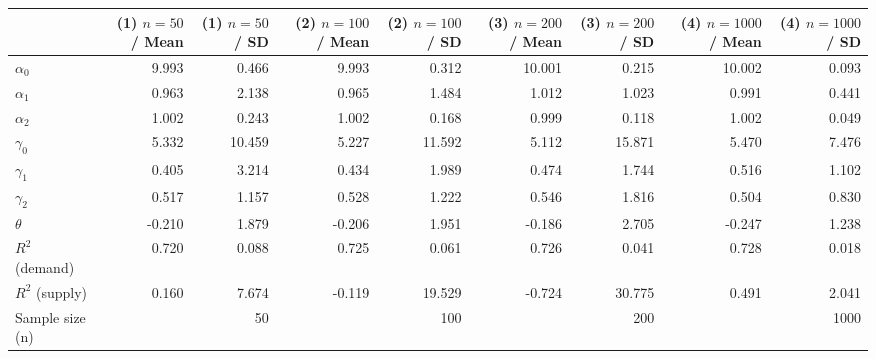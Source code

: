 
\begin{tabular}[t]{lrrrrrrrr}
\toprule
  & (1) $n=50$ / Mean & (1) $n=50$ / SD & (2) $n=100$ / Mean & (2) $n=100$ / SD & (3) $n=200$ / Mean & (3) $n=200$ / SD & (4) $n=1000$ / Mean & (4) $n=1000$ / SD\\
\midrule
$\alpha_{0}$ & 9.993 & 0.466 & 9.993 & 0.312 & 10.001 & 0.215 & 10.002 & 0.093\\
$\alpha_{1}$ & 0.963 & 2.138 & 0.965 & 1.484 & 1.012 & 1.023 & 0.991 & 0.441\\
$\alpha_{2}$ & 1.002 & 0.243 & 1.002 & 0.168 & 0.999 & 0.118 & 1.002 & 0.049\\
$\gamma_{0}$ & 5.332 & 10.459 & 5.227 & 11.592 & 5.112 & 15.871 & 5.470 & 7.476\\
$\gamma_{1}$ & 0.405 & 3.214 & 0.434 & 1.989 & 0.474 & 1.744 & 0.516 & 1.102\\
$\gamma_{2}$ & 0.517 & 1.157 & 0.528 & 1.222 & 0.546 & 1.816 & 0.504 & 0.830\\
$\theta$ & -0.210 & 1.879 & -0.206 & 1.951 & -0.186 & 2.705 & -0.247 & 1.238\\
$R^{2}$ (demand) & 0.720 & 0.088 & 0.725 & 0.061 & 0.726 & 0.041 & 0.728 & 0.018\\
$R^{2}$ (supply) & 0.160 & 7.674 & -0.119 & 19.529 & -0.724 & 30.775 & 0.491 & 2.041\\
Sample size (n) &  & 50 &  & 100 &  & 200 &  & 1000\\
\bottomrule
\end{tabular}
